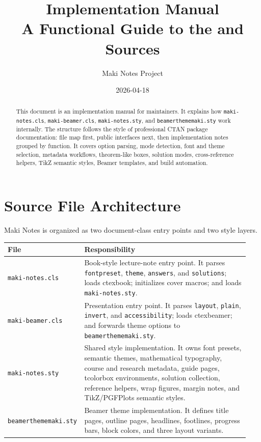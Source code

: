 \documentclass[a4paper,11pt]{ltxdoc}
\title{\Maki{} Implementation Manual\\
  \large A Functional Guide to the \mfile{.cls} and \mfile{.sty} Sources}
\author{Maki Notes Project}
\date{2026-04-18}
\newcommand{\mfile}[1]{\texttt{#1}}
\newcommand{\mcls}[1]{\textsf{#1}}
\newcommand{\mopt}[1]{\texttt{#1}}
\newcommand{\Maki}{\textsf{Maki Notes}}
\begin{document}
\maketitle
\tableofcontents

\begin{abstract}
This document is an implementation manual for maintainers. It explains how
\mfile{maki-notes.cls}, \mfile{maki-beamer.cls}, \mfile{maki-notes.sty}, and
\mfile{beamerthememaki.sty} work internally. The structure follows the style of
professional CTAN package documentation: file map first, public interfaces next,
then implementation notes grouped by function. It covers option parsing, mode
detection, font and theme selection, metadata workflows, theorem-like boxes,
solution modes, cross-reference helpers, TikZ semantic styles, Beamer templates,
and build automation.
\end{abstract}

\section{Source File Architecture}

\Maki{} is organized as two document-class entry points and two style layers.

\begin{longtable}{@{}p{0.26\linewidth}p{0.68\linewidth}@{}}
\toprule
File & Responsibility \\
\midrule
\mfile{maki-notes.cls} &
Book-style lecture-note entry point. It parses \mopt{fontpreset}, \mopt{theme},
\mopt{answers}, and \mopt{solutions}; loads \mcls{ctexbook}; initializes cover
macros; and loads \mfile{maki-notes.sty}.\\
\mfile{maki-beamer.cls} &
Presentation entry point. It parses \mopt{layout}, \mopt{plain}, \mopt{invert},
and \mopt{accessibility}; loads \mcls{ctexbeamer}; and forwards theme options to
\mfile{beamerthememaki.sty}.\\
\mfile{maki-notes.sty} &
Shared style implementation. It owns font presets, semantic themes, mathematical
typography, course and research metadata, guide pages, tcolorbox environments,
solution collection, reference helpers, wrap figures, margin notes, and
TikZ/PGFPlots semantic styles.\\
\mfile{beamerthememaki.sty} &
Beamer theme implementation. It defines title pages, outline pages, headlines,
footlines, progress bars, block colors, and three layout variants.\\
\bottomrule
\end{longtable}
\end{document}
